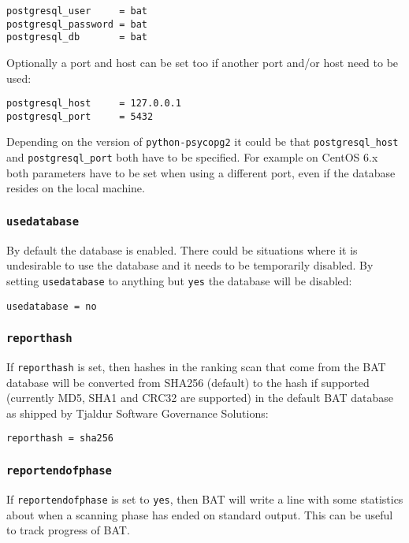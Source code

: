 \documentclass[10pt,a4paper]{article}
\begin{document}
\begin{verbatim}
postgresql_user     = bat
postgresql_password = bat
postgresql_db       = bat
\end{verbatim}

Optionally a port and host can be set too if another port and/or host need to
be used:

\begin{verbatim}
postgresql_host     = 127.0.0.1
postgresql_port     = 5432
\end{verbatim}

Depending on the version of \texttt{python-psycopg2} it could be that
\texttt{postgresql\_host} and \texttt{postgresql\_port} both have to be
specified. For example on CentOS 6.x both parameters have to be set when using
a different port, even if the database resides on the local machine.

\subsubsection{\texttt{usedatabase}}

By default the database is enabled. There could be situations where it is
undesirable to use the database and it needs to be temporarily disabled. By
setting \texttt{usedatabase} to anything but \texttt{yes} the database will
be disabled:

\begin{verbatim}
usedatabase = no
\end{verbatim}

\subsubsection{\texttt{reporthash}}

If \texttt{reporthash} is set, then hashes in the ranking scan that come from
the BAT database will be converted from SHA256 (default) to the hash if
supported (currently MD5, SHA1 and CRC32 are supported) in the default BAT
database as shipped by Tjaldur Software Governance Solutions:

\begin{verbatim}
reporthash = sha256
\end{verbatim}

\subsubsection{\texttt{reportendofphase}}

If \texttt{reportendofphase} is set to \texttt{yes}, then BAT will write a
line with some statistics about when a scanning phase has ended on standard
output. This can be useful to track progress of BAT.
\end{document}
